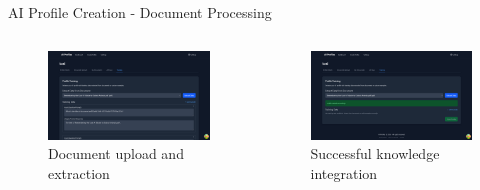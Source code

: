 \documentclass[aspectratio=169]{beamer}
\begin{document}
\begin{frame}{AI Profile Creation - Document Processing}
    \begin{columns}
        \begin{figure}
            \includegraphics[width=\textwidth,height=0.55\textheight,keepaspectratio]{../pfe-pics/ai-profile-creation/extract_info_from_file_and_training_pfrile.png}
            \caption{Document upload and extraction}
        \end{figure}
        \begin{figure}
            \includegraphics[width=\textwidth,height=0.55\textheight,keepaspectratio]{../pfe-pics/ai-profile-creation/succesful_knoladge_integration.png}
            \caption{Successful knowledge integration}
        \end{figure}
    \end{columns}
\end{frame}
\end{document}
